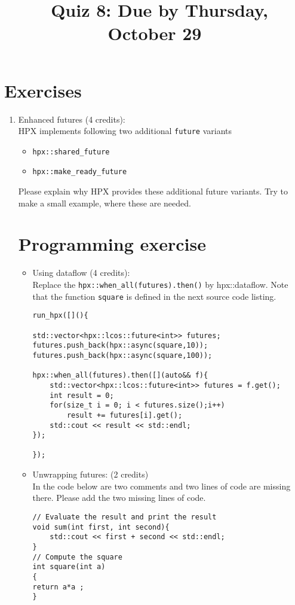 \documentclass[11pt]{article}
\begin{document}
\title{\coursename~Quiz 8: Due by Thursday, October 29}
\date{}
\maketitle

\medskip


\section*{Exercises}

\begin{enumerate}
\item Enhanced futures (4 credits): \\
HPX implements following two additional \lstinline|future| variants
\begin{itemize}
\item \lstinline|hpx::shared_future|
\item \lstinline|hpx::make_ready_future|
\end{itemize}
Please explain why HPX provides these additional future variants. Try to make a small example, where these are needed.

\section*{Programming exercise}

\begin{itemize}
\item Using dataflow (4 credits): \\
Replace the \lstinline|hpx::when_all(futures).then()| by hpx::dataflow. Note that the function \lstinline|square| is defined in the next source code listing.
\begin{lstlisting}
run_hpx([](){

std::vector<hpx::lcos::future<int>> futures;
futures.push_back(hpx::async(square,10));
futures.push_back(hpx::async(square,100));

hpx::when_all(futures).then([](auto&& f){
    std::vector<hpx::lcos::future<int>> futures = f.get();
    int result = 0;
    for(size_t i = 0; i < futures.size();i++)
        result += futures[i].get();
    std::cout << result << std::endl;
});

});
\end{lstlisting}

\item Unwrapping futures: (2 credits)\\
In the code below are two comments and two lines of code are missing there. Please add the two missing lines of code.
\begin{lstlisting}
// Evaluate the result and print the result
void sum(int first, int second){
	std::cout << first + second << std::endl;
}
// Compute the square 
int square(int a)
{
return a*a ;
}


\end{lstlisting}
\end{itemize}
\end{enumerate}
\end{document}

